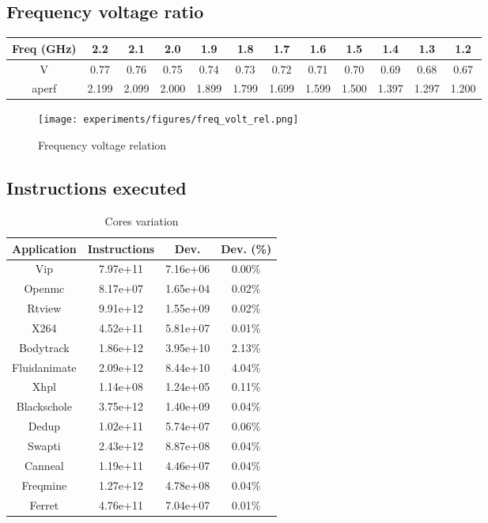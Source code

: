 \subsection{Frequency voltage ratio}

\begin{table}[H]
	\begin{tabular}{|c|c|c|c|c|c|c|c|c|c|c|c|}
		\hline
		Freq (GHz) & 2.2   & 2.1   & 2.0   & 1.9   & 1.8   & 1.7   & 1.6   & 1.5   & 1.4   & 1.3   & 1.2   \\ \hline
		V          & 0.77  & 0.76  & 0.75  & 0.74  & 0.73  & 0.72  & 0.71  & 0.70  & 0.69  & 0.68  & 0.67  \\ \hline
		aperf      & 2.199 & 2.099 & 2.000 & 1.899 & 1.799 & 1.699 & 1.599 & 1.500 & 1.397 & 1.297 & 1.200 \\ \hline
	\end{tabular}
\end{table}

\begin{figure}[H]
	\centering
	\texttt{[image: experiments/figures/freq\_volt\_rel.png]}
	\caption{Frequency voltage relation}
	\label{fig:freq_volt_rel}
\end{figure}

\subsection{Instructions executed}

\begin{table}[H]
	\caption{Cores variation}
	\begin{tabular}{|c|c|c|c|}
		\hline
		Application  & Instructions & Dev.     & Dev. (\%) \\ \hline
		Vip          & 7.97e+11     & 7.16e+06 & 0.00\%    \\ \hline
		Openmc       & 8.17e+07     & 1.65e+04 & 0.02\%    \\ \hline
		Rtview       & 9.91e+12     & 1.55e+09 & 0.02\%    \\ \hline
		X264         & 4.52e+11     & 5.81e+07 & 0.01\%    \\ \hline
		Bodytrack    & 1.86e+12     & 3.95e+10 & 2.13\%    \\ \hline
		Fluidanimate & 2.09e+12     & 8.44e+10 & 4.04\%    \\ \hline
		Xhpl         & 1.14e+08     & 1.24e+05 & 0.11\%    \\ \hline
		Blackschole  & 3.75e+12     & 1.40e+09 & 0.04\%    \\ \hline
		Dedup        & 1.02e+11     & 5.74e+07 & 0.06\%    \\ \hline
		Swapti       & 2.43e+12     & 8.87e+08 & 0.04\%    \\ \hline
		Canneal      & 1.19e+11     & 4.46e+07 & 0.04\%    \\ \hline
		Freqmine     & 1.27e+12     & 4.78e+08 & 0.04\%    \\ \hline
		Ferret       & 4.76e+11     & 7.04e+07 & 0.01\%    \\ \hline
	\end{tabular}
\end{table}

